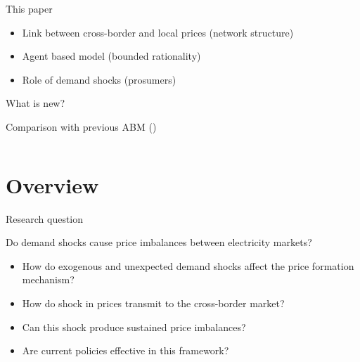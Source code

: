 \documentclass{beamer}
\begin{document}
\begin{frame}{This paper}
    \begin{itemize} \setlength\itemsep{1.5em}
        \item Link between cross-border and local prices (network structure)
        \item Agent based model (bounded rationality)
        \item Role of demand shocks (prosumers)
    \end{itemize}
\end{frame}

\begin{frame}{What is new?}

    Comparison with previous ABM (\cite{Weidlich2008})
    \vfill

    \begin{columns}[T,onlytextwidth]

        \begin{column}{.4\textwidth}
            \centering
            \resizebox{\textwidth}{!}{}
        \end{column}

        \hfill

        \begin{column}{.57\textwidth}
            \centering
            \resizebox{\textwidth}{!}{}
        \end{column}
    \end{columns}

\end{frame}

\section{Overview}

\begin{frame}{Research question}

    Do demand shocks cause price imbalances between electricity markets?

    \hfill

    \begin{itemize} \setlength{\itemsep}{1em}
        \item How do exogenous and unexpected demand shocks affect the price formation mechanism? \pause
        \item How do shock in prices transmit to the cross-border market? \pause
        \item Can this shock produce sustained price imbalances? \pause
        \item Are current policies effective in this framework?
    \end{itemize}

\end{frame}
\end{document}
